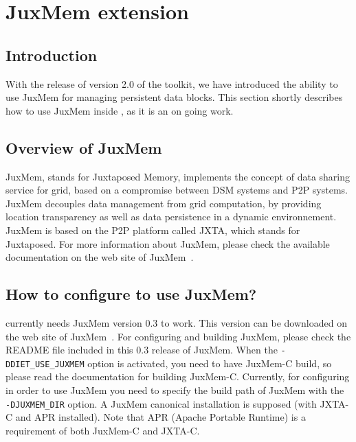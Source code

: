 
\chapter{JuxMem extension}
\label{ch:juxmem}

\section{Introduction}

With the release of version 2.0 of the \diet toolkit, we have introduced the
ability to use JuxMem for managing persistent data blocks. This
section shortly describes how to use JuxMem inside \diet, as it is an
on going work.

\section{Overview of JuxMem}

JuxMem, stands for Juxtaposed Memory, implements the concept of data
sharing service for grid, based on a compromise between DSM systems
and P2P systems. JuxMem decouples data management from grid
computation, by providing location transparency as well as data
persistence in a dynamic environnement. JuxMem is based on the P2P
platform called JXTA, which stands for Juxtaposed. For more
information about JuxMem, please check the available documentation on
the web site of JuxMem~\cite{JuxMem}.

\section{How to configure \diet to use JuxMem?}

\diet currently needs JuxMem version 0.3 to work. This version can be
downloaded on the web site of JuxMem~\cite{JuxMem}. For configuring
and building JuxMem, please check the README file included in this
0.3 release of JuxMem. When the \texttt{-DDIET\_USE\_JUXMEM} option is
activated, you need to have JuxMem-C build, so please read the
documentation for building JuxMem-C. Currently, for configuring \diet
in order to use JuxMem you need to specify the build path of JuxMem with
the \texttt{-DJUXMEM\_DIR} option. A JuxMem canonical installation is
 supposed (with JXTA-C and APR installed).
Note that APR (Apache Portable Runtime) is a requirement of both
JuxMem-C and JXTA-C.

